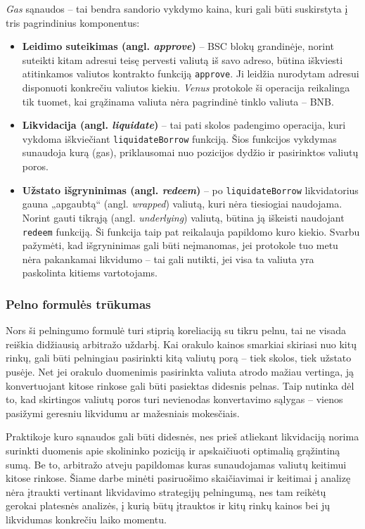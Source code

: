 \documentclass[]{VUMIFTemplateClass}
\begin{document}
\textit{Gas} sąnaudos – tai bendra sandorio vykdymo kaina, kuri gali būti suskirstyta į tris pagrindinius komponentus:
\begin{itemize}
    \item \textbf{Leidimo suteikimas (angl. \textit{approve})} – BSC blokų grandinėje, norint suteikti kitam adresui teisę pervesti valiutą iš savo adreso, būtina iškviesti atitinkamos valiutos kontrakto funkciją \texttt{approve}. Ji leidžia nurodytam adresui disponuoti konkrečiu valiutos kiekiu. \textit{Venus} protokole ši operacija reikalinga tik tuomet, kai grąžinama valiuta nėra pagrindinė tinklo valiuta – BNB.
  
    \item \textbf{Likvidacija (angl. \textit{liquidate})} – tai pati skolos padengimo operacija, kuri vykdoma iškviečiant \texttt{liquidateBorrow} funkciją. Šios funkcijos vykdymas sunaudoja kurą (gas), priklausomai nuo pozicijos dydžio ir pasirinktos valiutų poros.
  
    \item \textbf{Užstato išgryninimas (angl. \textit{redeem})} – po \texttt{liquidateBorrow} likvidatorius gauna „apgaubtą“ (angl. \textit{wrapped}) valiutą, kuri nėra tiesiogiai naudojama. Norint gauti tikrąją (angl. \textit{underlying}) valiutą, būtina ją iškeisti naudojant \texttt{redeem} funkciją. Ši funkcija taip pat reikalauja papildomo kuro kiekio. Svarbu pažymėti, kad išgryninimas gali būti neįmanomas, jei protokole tuo metu nėra pakankamai likvidumo – tai gali nutikti, jei visa ta valiuta yra paskolinta kitiems vartotojams.
\end{itemize}

\subsubsection{Pelno formulės trūkumas}

Nors ši pelningumo formulė turi stiprią koreliaciją su tikru pelnu, tai ne visada reiškia didžiausią arbitražo uždarbį. Kai orakulo kainos smarkiai skiriasi nuo kitų rinkų, gali būti pelningiau pasirinkti kitą valiutų porą – tiek skolos, tiek užstato pusėje. Net jei orakulo duomenimis pasirinkta valiuta atrodo mažiau vertinga, ją konvertuojant kitose rinkose gali būti pasiektas didesnis pelnas. Taip nutinka dėl to, kad skirtingos valiutų poros turi nevienodas konvertavimo sąlygas – vienos pasižymi geresniu likvidumu ar mažesniais mokesčiais.

Praktikoje kuro sąnaudos gali būti didesnės, nes prieš atliekant likvidaciją norima surinkti duomenis apie skolininko poziciją ir apskaičiuoti optimalią grąžintiną sumą. Be to, arbitražo atveju papildomas kuras sunaudojamas valiutų keitimui kitose rinkose. Šiame darbe minėti pasiruošimo skaičiavimai ir keitimai į analizę nėra įtraukti vertinant likvidavimo strategijų pelningumą, nes tam reikėtų gerokai platesnės analizės, į kurią būtų įtrauktos ir kitų rinkų kainos bei jų likvidumas konkrečiu laiko momentu.
\end{document}
